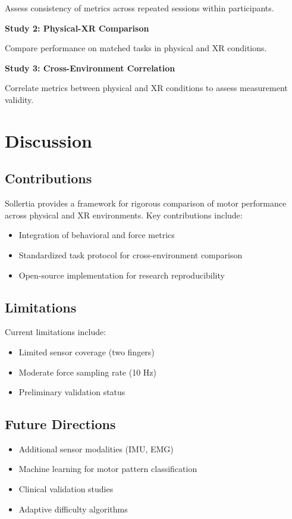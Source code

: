 \documentclass[11pt,twocolumn]{article}
\begin{document}
Assess consistency of metrics across repeated sessions within participants.

\textbf{Study 2: Physical-XR Comparison}

Compare performance on matched tasks in physical and XR conditions.

\textbf{Study 3: Cross-Environment Correlation}

Correlate metrics between physical and XR conditions to assess measurement validity.

\section{Discussion}

\subsection{Contributions}

Sollertia provides a framework for rigorous comparison of motor performance across physical and XR environments. Key contributions include:

\begin{itemize}
    \item Integration of behavioral and force metrics
    \item Standardized task protocol for cross-environment comparison
    \item Open-source implementation for research reproducibility
\end{itemize}

\subsection{Limitations}

Current limitations include:
\begin{itemize}
    \item Limited sensor coverage (two fingers)
    \item Moderate force sampling rate (10 Hz)
    \item Preliminary validation status
\end{itemize}

\subsection{Future Directions}

\begin{itemize}
    \item Additional sensor modalities (IMU, EMG)
    \item Machine learning for motor pattern classification
    \item Clinical validation studies
    \item Adaptive difficulty algorithms
\end{itemize}
\end{document}
